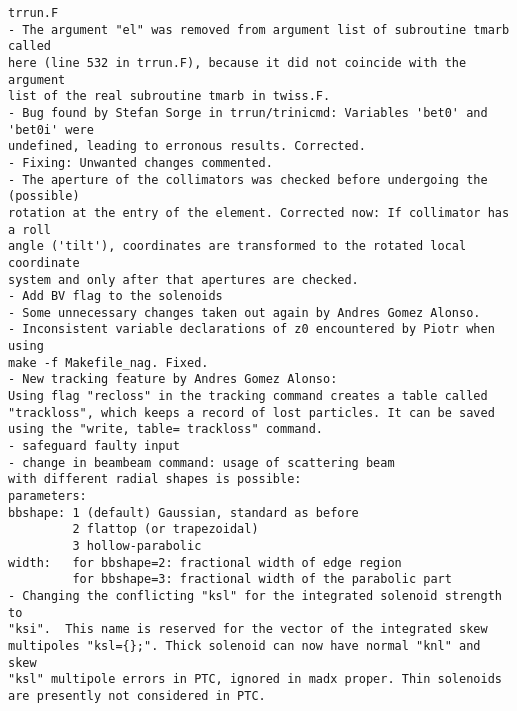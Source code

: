 \begin{verbatim}
trrun.F
- The argument "el" was removed from argument list of subroutine tmarb called
here (line 532 in trrun.F), because it did not coincide with the argument
list of the real subroutine tmarb in twiss.F.
- Bug found by Stefan Sorge in trrun/trinicmd: Variables 'bet0' and 'bet0i' were 
undefined, leading to erronous results. Corrected.
- Fixing: Unwanted changes commented.
- The aperture of the collimators was checked before undergoing the (possible) 
rotation at the entry of the element. Corrected now: If collimator has a roll 
angle ('tilt'), coordinates are transformed to the rotated local coordinate 
system and only after that apertures are checked.
- Add BV flag to the solenoids
- Some unnecessary changes taken out again by Andres Gomez Alonso.
- Inconsistent variable declarations of z0 encountered by Piotr when using
make -f Makefile_nag. Fixed.
- New tracking feature by Andres Gomez Alonso:
Using flag "recloss" in the tracking command creates a table called
"trackloss", which keeps a record of lost particles. It can be saved
using the "write, table= trackloss" command.
- safeguard faulty input
- change in beambeam command: usage of scattering beam
with different radial shapes is possible:
parameters:
bbshape: 1 (default) Gaussian, standard as before
         2 flattop (or trapezoidal)
         3 hollow-parabolic
width:   for bbshape=2: fractional width of edge region
         for bbshape=3: fractional width of the parabolic part
- Changing the conflicting "ksl" for the integrated solenoid strength to
"ksi".  This name is reserved for the vector of the integrated skew
multipoles "ksl={};". Thick solenoid can now have normal "knl" and skew
"ksl" multipole errors in PTC, ignored in madx proper. Thin solenoids
are presently not considered in PTC.


\end{verbatim}
